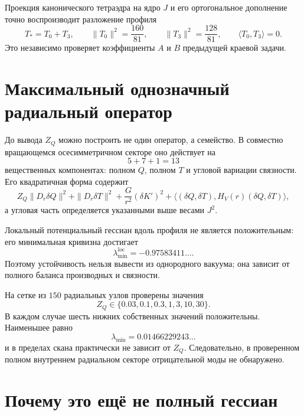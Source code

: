 Проекция канонического тетраэдра на ядро $J$ и его ортогональное
дополнение точно воспроизводит разложение профиля
\begin{equation}
 T_*=T_0+T_3,
 \qquad
 \|T_0\|^2=\frac{160}{81},
 \qquad
 \|T_3\|^2=\frac{128}{81},
 \qquad
 \langle T_0,T_3\rangle=0.
\end{equation}
Это независимо проверяет коэффициенты $A$ и $B$ предыдущей краевой
задачи.

\section{Максимальный однозначный радиальный оператор}

До вывода $Z_Q$ можно построить не один оператор, а семейство. В
совместно вращающемся осесимметричном секторе оно действует на
\begin{equation}
 5+7+1=13
\end{equation}
вещественных компонентах: полном $Q$, полном $T$ и угловой вариации
связности. Его квадратичная форма содержит
\begin{equation}
 Z_Q\|D_r\delta Q\|^2
 +\|D_r\delta T\|^2
 +\frac{G}{r^2}(\delta K')^2
 +\langle(\delta Q,\delta T),H_V(r)(\delta Q,\delta T)\rangle,
\end{equation}
а угловая часть определяется указанными выше весами $J^2$.

Локальный потенциальный гессиан вдоль профиля не является положительным:
его минимальная кривизна достигает
\begin{equation}
 \lambda_{\min}^{\mathrm{loc}}=-0.97583411\ldots.
\end{equation}
Поэтому устойчивость нельзя вывести из однородного вакуума; она зависит
от полного баланса производных и связности.

На сетке из $150$ радиальных узлов проверены значения
\begin{equation}
 Z_Q\in\{0.03,0.1,0.3,1,3,10,30\}.
\end{equation}
В каждом случае шесть нижних собственных значений положительны. Наименьшее
равно
\begin{equation}
 \lambda_{\min}=0.01466229243\ldots
\end{equation}
и в пределах скана практически не зависит от $Z_Q$. Следовательно, в
проверенном полном внутреннем радиальном секторе отрицательной моды не
обнаружено.

\section{Почему это ещё не полный гессиан}

